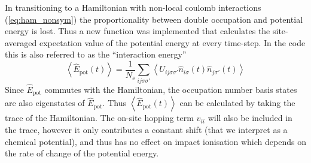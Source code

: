 In transitioning to a Hamiltonian with non-local coulomb interactions (\ref{eq:ham_nonsym}) the proportionality between double occupation and potential energy is lost. Thus a new function was implemented that calculates the site-averaged expectation value of the potential energy at every time-step. In the code this is also referred to as the ``interaction energy''
\begin{equation}
    \left\langle{\hat{E}_{\text{pot}}(t)}\right\rangle = \frac{1}{N_s} \sum_{ij\sigma\sigma'} \left\langle{U_{ij\sigma\sigma'}\hat{n}_{i \sigma}(t) \hat{n}_{j\sigma'}(t)}\right\rangle
\end{equation}
Since $\hat{E}_{\text{pot}}$ commutes with the Hamiltonian, the occupation number basis states are also eigenstates of $\hat{E}_{\text{pot}}$. Thus $\left\langle{\hat{E}_{\text{pot}}(t)}\right\rangle$ can be calculated by taking the trace of the Hamiltonian. The on-site hopping term $v_{ii}$ will also be included in the trace, however it only contributes a constant shift (that we interpret as a chemical potential), and thus has no effect on impact ionisation which depends on the rate of change of the potential energy.